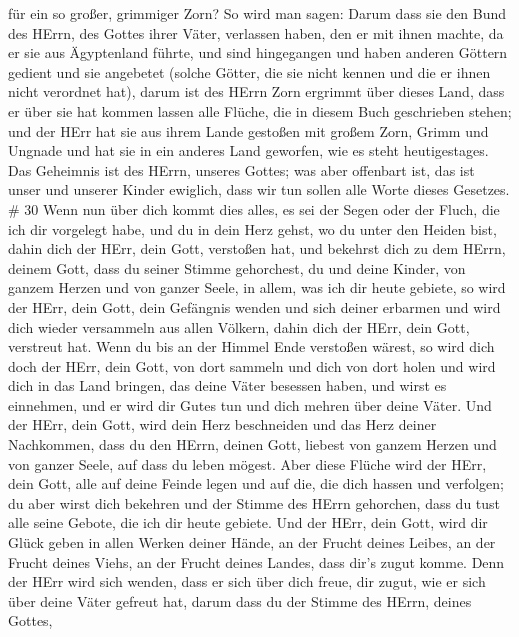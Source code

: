 für ein so großer, grimmiger Zorn?  So wird man sagen:
Darum dass sie den Bund des HErrn, des Gottes ihrer Väter, verlassen
haben, den er mit ihnen machte, da er sie aus Ägyptenland führte,
 und sind hingegangen und haben anderen Göttern gedient und
sie angebetet (solche Götter, die sie nicht kennen und die er ihnen
nicht verordnet hat),  darum ist des HErrn Zorn ergrimmt
über dieses Land, dass er über sie hat kommen lassen alle Flüche, die in
diesem Buch geschrieben stehen;  und der HErr hat sie aus
ihrem Lande gestoßen mit großem Zorn, Grimm und Ungnade und hat sie in
ein anderes Land geworfen, wie es steht heutigestages.  Das
Geheimnis ist des HErrn, unseres Gottes; was aber offenbart ist, das ist
unser und unserer Kinder ewiglich, dass wir tun sollen alle Worte dieses
Gesetzes. \# 30  Wenn nun über dich kommt dies alles, es sei
der Segen oder der Fluch, die ich dir vorgelegt habe, und du in dein
Herz gehst, wo du unter den Heiden bist, dahin dich der HErr, dein Gott,
verstoßen hat,  und bekehrst dich zu dem HErrn, deinem Gott,
dass du seiner Stimme gehorchest, du und deine Kinder, von ganzem Herzen
und von ganzer Seele, in allem, was ich dir heute gebiete, 
so wird der HErr, dein Gott, dein Gefängnis wenden und sich deiner
erbarmen und wird dich wieder versammeln aus allen Völkern, dahin dich
der HErr, dein Gott, verstreut hat.  Wenn du bis an der
Himmel Ende verstoßen wärest, so wird dich doch der HErr, dein Gott, von
dort sammeln und dich von dort holen  und wird dich in das
Land bringen, das deine Väter besessen haben, und wirst es einnehmen,
und er wird dir Gutes tun und dich mehren über deine Väter. 
Und der HErr, dein Gott, wird dein Herz beschneiden und das Herz deiner
Nachkommen, dass du den HErrn, deinen Gott, liebest von ganzem Herzen
und von ganzer Seele, auf dass du leben mögest.  Aber diese
Flüche wird der HErr, dein Gott, alle auf deine Feinde legen und auf
die, die dich hassen und verfolgen;  du aber wirst dich
bekehren und der Stimme des HErrn gehorchen, dass du tust alle seine
Gebote, die ich dir heute gebiete.  Und der HErr, dein Gott,
wird dir Glück geben in allen Werken deiner Hände, an der Frucht deines
Leibes, an der Frucht deines Viehs, an der Frucht deines Landes, dass
dir's zugut komme. Denn der HErr wird sich wenden, dass er sich über
dich freue, dir zugut, wie er sich über deine Väter gefreut hat,
 darum dass du der Stimme des HErrn, deines Gottes,
